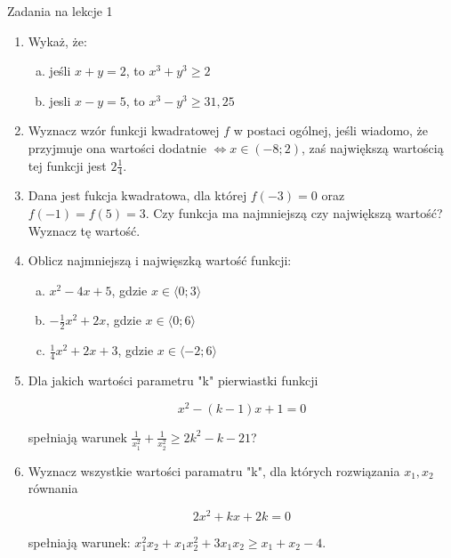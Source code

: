 \documentclass[12pt,a4paper]{article}
\begin{document}
	
	\begin{center}
		\LARGE Zadania na lekcje 1
	\end{center}
	\vspace{1.5cm}
	
	\begin{enumerate}[1.]
		\item Wykaż, że:
		
		\begin{enumerate}[a)]
			\item jeśli $x+y=2$, to $x^3+y^3\geq 2$
			\item jesli $x-y=5$, to $x^3-y^3\geq31,25$
		\end{enumerate}
	
	\item Wyznacz wzór funkcji kwadratowej $f$ w postaci ogólnej, jeśli wiadomo, że przyjmuje ona wartości dodatnie $\Leftrightarrow x\in (-8;2)$, zaś największą wartością tej funkcji jest $2\frac{1}{4}$.
	
	\item Dana jest fukcja kwadratowa, dla której $f(-3)=0$ oraz $f(-1)=f(5)=3$. Czy funkcja ma najmniejszą czy największą wartość? Wyznacz tę wartość.
	
	\item Oblicz najmniejszą i najwięszką wartość funkcji:
	\begin{enumerate}[a)]
		\item $x^2-4x+5$, gdzie $x\in\langle0;3\rangle$
		\item $-\frac{1}{2}x^2+2x$, gdzie $x\in\langle0;6\rangle$
		\item $\frac{1}{4}x^2+2x+3$, gdzie $x\in\langle-2;6\rangle$
	\end{enumerate} 

	\item Dla jakich wartości parametru "k" pierwiastki funkcji
	
	$$x^2-(k-1)x + 1 = 0$$ 
	
	spełniają warunek $\frac{1}{x_1^2}+\frac{1}{x_2^2}\geq 2k^2-k-21$?
	
	\item Wyznacz wszystkie wartości paramatru "k", dla których rozwiązania $x_1,x_2$ równania
	
	$$2x^2+kx+2k=0$$
	
	spełniają warunek: $x_1^2 x_2+x_1 x_2^2 + 3x_1x_2\geq x_1+x_2-4$.
		
	\end{enumerate}

	\newpage
	
\end{document}
